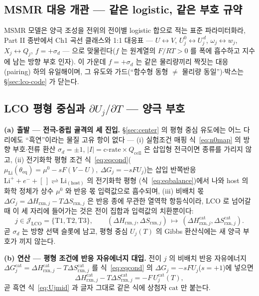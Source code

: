 \documentclass[11pt,a4paper]{article}
\newcommand{\eq}{\mathrm{eq}}
\newcommand{\cell}{\mathrm{cell}}
\newcommand{\rxn}{\mathrm{rxn}}
\begin{document}
\subsection{MSMR 대응 개관 --- 같은 logistic, 같은 부호 규약}\label{sec:lco-preview}
MSMR 모델은 양극 조성을 전위의 전이별 logistic 합으로 적는 표준
파라미터화라, Part II 종반에서 Ch1 곡선 클래스와 1:1 대응표 --- $U\leftrightarrow V$,
$U_j^0\leftrightarrow U_j^{\,d}$, $\omega_j\leftrightarrow w_j$, $X_j\leftrightarrow Q_j$, $f=+\sigma_d$ ---
으로 맞물린다($f$ 는 원계열의 $F/RT>0$ 를 폭에 흡수하고 지수에 남는 방향 부호 인자). 이 가운데
$f=+\sigma_d$ 는 같은 물리량끼리 짝짓는 대응(pairing) 하의 유일해이며, 그 유도와 가드(``함수형 동형 $\ne$ 물리량
동일'')$\cdot$박스는 \S\ref{sec:lco-code} 가 닫는다.

\subsection{LCO 평형 중심과 $\partial U_j/\partial T$ — 양극 부호}\label{sec:lco-center}
\textbf{(a) 출발 — 전극-중립 골격의 세 진입.}
\S\ref{sec:center} 의 평형 중심 유도에는 어느 다리에도 ``흑연''이라는 물질 고유 항이 없다 —
(i) 실험조건 매핑 식~\eqref{eq:n0map} 의 방향 부호$\cdot$전류 환산
$\sigma_d=\pm1$, $|I|=\text{c-rate}\times Q_\cell$ 은 삽입형 전극이면 종류를 가리지 않고, (ii) 전기화학 평형
조건 식~\eqref{eq:eqcond}($\mu_\mathrm{Li}(\theta_\eq)=\mu^0-sF(V-U),\ \Delta G_j=-sFU_j$)는 삽입
반쪽반응 $\mathrm{Li}^++e^-+[\,]\rightleftharpoons\mathrm{Li}_{(\text{host})}$ 의 전기화학 평형
(식~\eqref{eq:eqbalance})에서 나와 host 의 화학 정체가 상수 $\mu^0$ 와 반응 몫 입력값으로 흡수되며,
(iii) 비배치 몫 $\Delta G_j=\Delta H_{\rxn,j}-T\Delta S_{\rxn,j}$ 은 반응 종에 무관한 열역학 항등식이라,
LCO 로 넘어갈 때 이 세 자리에 들어가는 것은 전이 집합과 입력값의 치환뿐이다:
\begin{equation}
j\in\mathcal J_\mathrm{LCO}=\{\mathrm{T1},\mathrm{T2},\mathrm{T3}\},\qquad
(\Delta H_{\rxn,j},\Delta S_{\rxn,j})\ \longmapsto\
(\Delta H_{\rxn,j}^\mathrm{cat},\Delta S_{\rxn,j}^\mathrm{cat}).
\label{eq:lco-n0sub}
\end{equation}
곧 $\sigma_d$ 는 방향 선택 슬롯에 남고, 평형 중심 $U_j(T)$ 의 Gibbs 환산식에는 새 양극 부호가 끼지 않는다.

\textbf{(b) 연산 — 평형 조건에 반응 자유에너지 대입.}
전이 $j$ 의 비배치 반응 자유에너지 $\Delta G_j^\mathrm{cat}=\Delta H_{\rxn,j}^\mathrm{cat}
-T\Delta S_{\rxn,j}^\mathrm{cat}$ 를 식~\eqref{eq:eqcond} 의 $\Delta G_j=-sFU_j$($s=+1$)에 넣으면
\[
\Delta H_{\rxn,j}^\mathrm{cat}-T\Delta S_{\rxn,j}^\mathrm{cat}=-F\,U_j^\mathrm{cat}(T),
\]
곧 흑연 식~\eqref{eq:Ujmid} 과 글자 그대로 같은 식에 상첨자 $\mathrm{cat}$ 만 붙는다.
\end{document}
